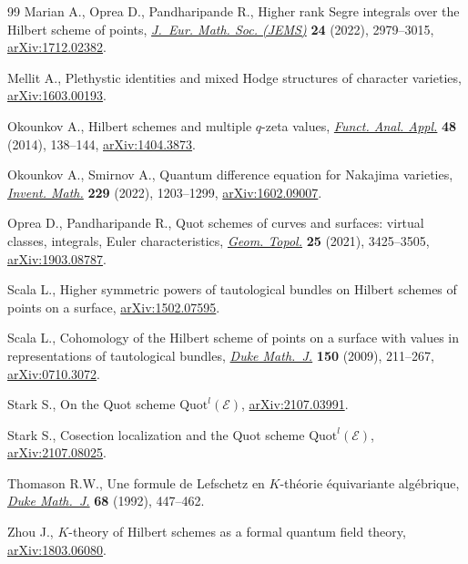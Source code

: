 \documentclass[10pt,a4paper]{amsart}
\numberwithin{equation}{section}
\begin{document}
\begin{thebibliography}{99}
Marian A., Oprea D., Pandharipande R., Higher rank {S}egre integrals over the
 {H}ilbert scheme of points, \href{https://doi.org/10.4171/jems/1149}{\textit{J.~Eur. Math. Soc. (JEMS)}} \textbf{24}
 (2022), 2979--3015, \href{https://arxiv.org/abs/1712.02382}{arXiv:1712.02382}.

Mellit A., Plethystic identities and mixed {H}odge structures of character
 varieties, \href{https://arxiv.org/abs/1603.00193}{arXiv:1603.00193}.

Okounkov A., Hilbert schemes and multiple {$q$}-zeta values, \href{https://doi.org/10.1007/s10688-014-0054-z}{\textit{Funct.
 Anal. Appl.}} \textbf{48} (2014), 138--144, \href{https://arxiv.org/abs/1404.3873}{arXiv:1404.3873}.

Okounkov A., Smirnov A., Quantum difference equation for {N}akajima varieties,
 \href{https://doi.org/10.1007/s00222-022-01125-w}{\textit{Invent. Math.}} \textbf{229} (2022), 1203--1299, \href{https://arxiv.org/abs/1602.09007}{arXiv:1602.09007}.

Oprea D., Pandharipande R., Quot schemes of curves and surfaces: virtual
 classes, integrals, {E}uler characteristics, \href{https://doi.org/10.2140/gt.2021.25.3425}{\textit{Geom. Topol.}}
 \textbf{25} (2021), 3425--3505, \href{https://arxiv.org/abs/1903.08787}{arXiv:1903.08787}.

Scala L., Higher symmetric powers of tautological bundles on {H}ilbert schemes
 of points on a surface, \href{https://arxiv.org/abs/1502.07595}{arXiv:1502.07595}.

Scala L., Cohomology of the {H}ilbert scheme of points on a surface with values
 in representations of tautological bundles, \href{https://doi.org/10.1215/00127094-2009-050}{\textit{Duke Math.~J.}}
 \textbf{150} (2009), 211--267, \href{https://arxiv.org/abs/0710.3072}{arXiv:0710.3072}.

Stark S., On the Quot scheme {$\mathrm{Quot}^l(\mathscr{E})$},
 \href{https://arxiv.org/abs/2107.03991}{arXiv:2107.03991}.

Stark S., Cosection localization and the Quot scheme
 $\mathrm{Quot}^{l}(\mathscr{E})$, \href{https://arxiv.org/abs/2107.08025}{arXiv:2107.08025}.

Thomason R.W., Une formule de {L}efschetz en {$K$}-th\'eorie \'equivariante
 alg\'ebrique, \href{https://doi.org/10.1215/S0012-7094-92-06817-7}{\textit{Duke Math.~J.}} \textbf{68} (1992), 447--462.

Zhou J., {$K$}-theory of {H}ilbert schemes as a formal quantum field theory,
 \href{https://arxiv.org/abs/1803.06080}{arXiv:1803.06080}.

\end{thebibliography}
\end{document}
